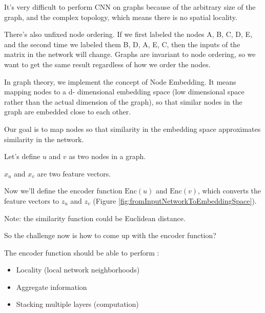 It’s very difficult to perform CNN on graphs because of the arbitrary size of
the graph, and the complex topology, which means there is no spatial locality.
\newline

There’s also unfixed node ordering. If we first labeled the nodes A, B, C, D, E,
and the second time we labeled them B, D, A, E, C, then the inputs of the matrix
in the network will change. Graphs are invariant to node ordering, so we want to
get the same result regardless of how we order the nodes.
\newline

In graph theory, we implement the concept of Node Embedding. It means mapping nodes
to a d- dimensional embedding space (low dimensional space rather than the actual
dimension of the graph), so that similar nodes in the graph are embedded close to
each other.
\newline

Our goal is to map nodes so that similarity in the embedding space approximates similarity
in the network.
\newline

Let’s define $u$ and $v$ as two nodes in a graph.
\newline

$x_{u}$ and $x_{v}$ are two feature vectors.
\newline

Now we’ll define the encoder function $\text{Enc}(u)$ and $\text{Enc}(v)$, which
converts the feature vectors to $z_{u}$ and $z_{v}$ (Figure \ref{fig:fromInputNetworkToEmbeddingSpace}).
\newline

Note: the similarity function could be Euclidean distance.
\newline

So the challenge now is how to come up with the encoder function?
\newline

The encoder function should be able to perform :
\newline

\begin{itemize}
	\item Locality (local network neighborhoods)

	\item Aggregate information

	\item Stacking multiple layers (computation)
\end{itemize}

